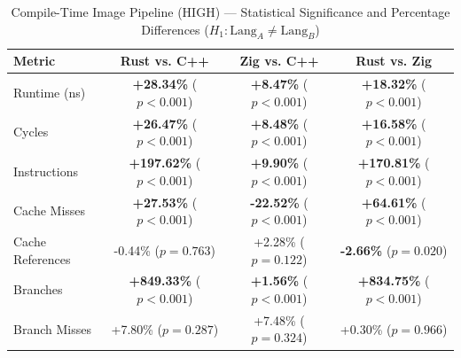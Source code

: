 \begin{table}[htbp]
\centering
\caption{Compile-Time Image Pipeline (HIGH) --- Statistical Significance and Percentage Differences ($H_1: \text{Lang}_A \neq \text{Lang}_B$)}
\label{tab:image_pipeline_comptime_HIGH_true_true_true}
\begin{tabular}{l ccc}
\toprule
\textbf{Metric} & \textbf{Rust vs. C++} & \textbf{Zig vs. C++} & \textbf{Rust vs. Zig} \\
\midrule
Runtime (ns) & \textbf{+28.34\%} ($p < 0.001$) & \textbf{+8.47\%} ($p < 0.001$) & \textbf{+18.32\%} ($p < 0.001$) \\
Cycles & \textbf{+26.47\%} ($p < 0.001$) & \textbf{+8.48\%} ($p < 0.001$) & \textbf{+16.58\%} ($p < 0.001$) \\
Instructions & \textbf{+197.62\%} ($p < 0.001$) & \textbf{+9.90\%} ($p < 0.001$) & \textbf{+170.81\%} ($p < 0.001$) \\
Cache Misses & \textbf{+27.53\%} ($p < 0.001$) & \textbf{-22.52\%} ($p < 0.001$) & \textbf{+64.61\%} ($p < 0.001$) \\
Cache References & -0.44\% ($p = 0.763$) & +2.28\% ($p = 0.122$) & \textbf{-2.66\%} ($p = 0.020$) \\
Branches & \textbf{+849.33\%} ($p < 0.001$) & \textbf{+1.56\%} ($p < 0.001$) & \textbf{+834.75\%} ($p < 0.001$) \\
Branch Misses & +7.80\% ($p = 0.287$) & +7.48\% ($p = 0.324$) & +0.30\% ($p = 0.966$) \\
\bottomrule
\end{tabular}
\end{table}


